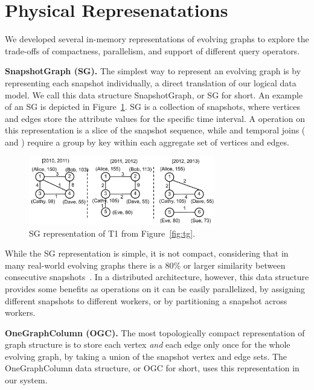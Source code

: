 \section{Physical Represenatations}
\label{sec:physical}

We developed several in-memory representations of evolving graphs to
explore the trade-offs of compactness, parallelism, and support of
different query operators. 

{\bf SnapshotGraph (SG).} The simplest way to represent an evolving
graph is by representing each snapshot individually, a direct
translation of our logical data model.  We call this data structure
SnapshotGraph, or SG for short. An example of an SG is depicted in
Figure~\ref{fig:sgp}.  SG is a collection of snapshots, where vertices
and edges store the attribute values for the specific time interval.
A  operation on this representation is a slice of the
snapshot sequence, while  and temporal joins
( and ) require a group by key within each
aggregate set of vertices and edges.

\begin{figure}[t!]
\includegraphics[width=3.2in]{figs/sgp.pdf}
\caption{SG representation of T1 from Figure~\ref{fig:tg}.}
\label{fig:sgp}
\end{figure}

While the SG representation is simple, it is not compact, considering
that in many real-world evolving graphs there is a 80\% or larger
similarity between consecutive
snapshots~\cite{DBLP:journals/tos/MiaoHLWYZPCC15}.  In a distributed
architecture, however, this data structure provides some benefits as
operations on it can be easily parallelized, by assigning different
snapshots to different workers, or by partitioning a snapshot across
workers.  

{\bf OneGraphColumn (OGC).}  The most topologically compact
representation of graph structure is to store each vertex {\em and}
each edge only once for the whole evolving graph, by taking a union of
the snapshot vertex and edge sets.  The OneGraphColumn data structure,
or OGC for short, uses this representation in our system. 

